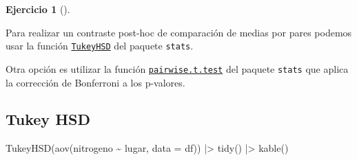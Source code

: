 \documentclass[
  a4paper,
]{scrreport}
\newenvironment{Shaded}{\begin{snugshade}}{\end{snugshade}}
\newcommand{\AttributeTok}[1]{\textcolor[rgb]{0.40,0.45,0.13}{#1}}
\newcommand{\FunctionTok}[1]{\textcolor[rgb]{0.28,0.35,0.67}{#1}}
\newcommand{\NormalTok}[1]{\textcolor[rgb]{0.00,0.23,0.31}{#1}}
\newcommand{\SpecialCharTok}[1]{\textcolor[rgb]{0.37,0.37,0.37}{#1}}
\theoremstyle{definition}
\newtheorem{exercise}{Ejercicio}[chapter]
\theoremstyle{remark}
\begin{document}
\begin{exercise}[]
\begin{enumerate}
\begin{tcolorbox}
  Para realizar un contraste post-hoc de comparación de medias por pares
  podemos usar la función
  \href{https://rdrr.io/r/stats/TukeyHSD.html}{\texttt{TukeyHSD}} del
  paquete \texttt{stats}.

  Otra opción es utilizar la función
  \href{https://rdrr.io/r/stats/pairwise.t.test.html}{\texttt{pairwise.t.test}}
  del paquete \texttt{stats} que aplica la corrección de Bonferroni a
  los p-valores.

  \end{tcolorbox}

  \begin{tcolorbox}[enhanced jigsaw, breakable, toptitle=1mm, colbacktitle=quarto-callout-tip-color!10!white, rightrule=.15mm, opacityback=0, opacitybacktitle=0.6, titlerule=0mm, coltitle=black, colframe=quarto-callout-tip-color-frame, colback=white, bottomtitle=1mm, leftrule=.75mm, toprule=.15mm, title=\textcolor{quarto-callout-tip-color}{\faLightbulb}\hspace{0.5em}{Solución}, arc=.35mm, bottomrule=.15mm, left=2mm]

  \section{Tukey HSD}

\begin{Shaded}
\begin{Highlighting}[]
\FunctionTok{TukeyHSD}\NormalTok{(}\FunctionTok{aov}\NormalTok{(nitrogeno }\SpecialCharTok{\textasciitilde{}}\NormalTok{ lugar, }\AttributeTok{data =}\NormalTok{ df)) }\SpecialCharTok{|\textgreater{}} 
    \FunctionTok{tidy}\NormalTok{() }\SpecialCharTok{|\textgreater{}} 
    \FunctionTok{kable}\NormalTok{()}
\end{Highlighting}
\end{Shaded}


\end{tcolorbox}
\end{enumerate}
\end{exercise}
\end{document}
